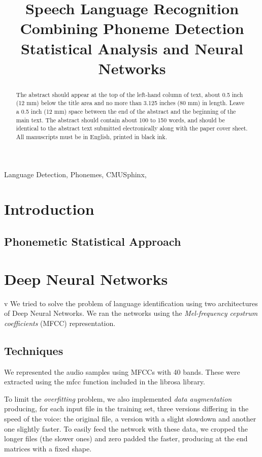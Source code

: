 \documentclass{article}
\title{Speech Language Recognition Combining Phoneme Detection Statistical Analysis and Neural Networks}
\begin{document}
%
\maketitle
%
\begin{abstract}
The abstract should appear at the top of the left-hand column of text, about
0.5 inch (12 mm) below the title area and no more than 3.125 inches (80 mm) in
length.  Leave a 0.5 inch (12 mm) space between the end of the abstract and the
beginning of the main text.  The abstract should contain about 100 to 150
words, and should be identical to the abstract text submitted electronically
along with the paper cover sheet.  All manuscripts must be in English, printed
in black ink.
\end{abstract}
%
\begin{keywords}
Language Detection, Phonemes, CMUSphinx,
\end{keywords}
%
\section{Introduction}
\label{sec:intro}

\subsection{Phonemetic Statistical Approach}
\vfill\pagebreak

\section{Deep Neural Networks}
\label{sec:dnn}
v
We tried to solve the problem of language identification using two architectures of Deep Neural Networks. We ran the networks using the \emph{Mel-frequency cepstrum coefficients} (MFCC) representation.

\subsection{Techniques}
\label{subsec:dnn-tech}
We represented the audio samples using MFCCs with 40 bands. These were extracted using the mfcc function included in the librosa library.

To limit the \emph{overfitting} problem, we also implemented \emph{data augmentation} producing, for each input file in the training set, three versions differing in the speed of the voice: the original file, a version with a slight slowdown and another one slightly faster. To easily feed the network with these data, we cropped the longer files (the slower ones) and zero padded the faster, producing at the end matrices with a fixed shape.
\end{document}
